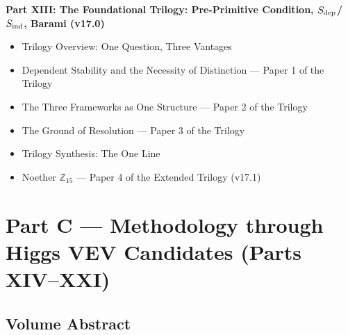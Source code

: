 \documentclass[11pt, a4paper]{article}
\begin{document}
\begin{contentsbox}[title={Part B --- Part and Section Headers}]
\textbf{Part XIII: The Foundational Trilogy: Pre-Primitive Condition, $S_{\rm dep}$/$S_{\rm ind}$, Barami (v17.0)}
\begin{itemize}[noitemsep,leftmargin=1.5em]
  \item Trilogy Overview: One Question, Three Vantages
  \item Dependent Stability and the Necessity of Distinction --- Paper 1 of the Trilogy
  \item The Three Frameworks as One Structure --- Paper 2 of the Trilogy
  \item The Ground of Resolution --- Paper 3 of the Trilogy
  \item Trilogy Synthesis: The One Line
  \item Noether $\mathbb{Z}_{15}$ --- Paper 4 of the Extended Trilogy (v17.1)
\end{itemize}
\end{contentsbox}

\newpage

\section{Part C --- Methodology through Higgs VEV Candidates (Parts XIV--XXI)}

\subsection*{Volume Abstract}
\end{document}
